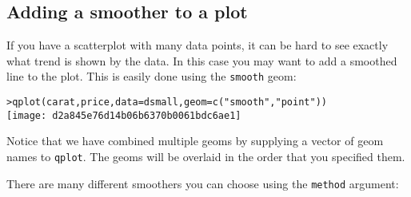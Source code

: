 


\subsection{Adding a smoother to a plot}\label{sub:smooth}

If you have a scatterplot with many data points, it can be hard to see exactly what trend is shown by the data.  In this case you may want to add a smoothed line to the plot.  This is easily done using the {\tt smooth} geom:

\begin{alltt}
> qplot(carat, price, data = dsmall, geom = c("smooth", "point"))
\texttt{[image: d2a845e76d14b06b6370b0061bdc6ae1]}

\end{alltt}

Notice that we have combined multiple geoms by supplying a vector of geom names to {\tt qplot}.  The geoms will be overlaid in the order that you specified them.

There are many different smoothers you can choose using the {\tt method} argument:

